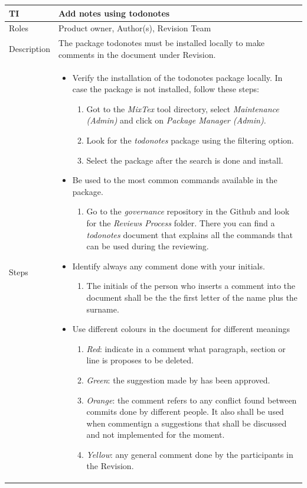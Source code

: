 \documentclass{template/openetcs_article}
\begin{document}
\begin{flushleft}
\tablefirsthead{}
\tablehead{}
\tabletail{}
\tablelasttail{}
\begin{supertabular}{|m{2cm}|m{13cm}|}
\hline
{}
TI & 
Add notes using todonotes
\\\hline
Roles &
Product owner, Author(s), Revision Team
\\\hline
Description &
The package todonotes must be installed locally to make comments in the document under Revision. 
\\\hline
Steps &
\begin{itemize}
\item Verify the installation of the todonotes package locally. In case the package is not installed, follow these steps:
\begin{enumerate}
\item Got to the {\it MixTex} tool directory, select {\it Maintenance (Admin)} and click on {\it Package Manager (Admin)}.
\item Look for the {\it todonotes} package using the filtering option.
\item Select the package after the search is done and install.
\end{enumerate}
\item Be used to the most common commands available in the package.
\begin{enumerate}
\item Go to the {\it governance} repository in the Github and look for the {\it Reviews Process} folder. There you can find a {\it todonotes} document that explains all the commands that can be used during the reviewing.
\end{enumerate}
\item Identify always any comment done with your initials.
\begin{enumerate} 
\item The initials of the person who inserts a comment into the document shall be the the first letter of the name plus the surname.
\end{enumerate}
\item Use different colours in the document for different meanings 
\begin{enumerate}
\item {\it Red}: indicate in a comment what paragraph, section or line is proposes to be deleted. 
\item {\it Green}: the suggestion made by has been approved.
\item {\it Orange}: the comment refers to any conflict found between commits done by different people. It also shall be used when commentign a suggestions that shall be discussed and not implemented for the moment.
\item {\it Yellow}: any general comment done by the participants in the Revision. 
\end{enumerate} 
\end{itemize}

\\\hline
\end{supertabular}
\end{flushleft}
\end{document}
